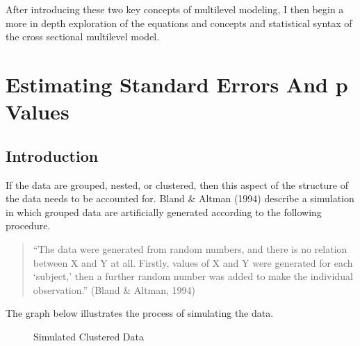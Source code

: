 \documentclass[
  letterpaper,
  DIV=11,
  numbers=noendperiod]{scrreprt}
\begin{document}
After introducing these two key concepts of multilevel modeling, I then
begin a more in depth exploration of the equations and concepts and
statistical syntax of the cross sectional multilevel model.

\section{Estimating Standard Errors And p Values}\label{sec-pvalues}

\subsection{Introduction}\label{introduction-1}

If the data are grouped, nested, or clustered, then this aspect of the
structure of the data needs to be accounted for. Bland \& Altman (1994)
describe a simulation in which grouped data are artificially generated
according to the following procedure. 

\begin{quote}
``The data were generated from random numbers, and there is no relation
between X and Y at all. Firstly, values of X and Y were generated for
each `subject,' then a further random number was added to make the
individual observation.'' (Bland \& Altman, 1994)
\end{quote}

The graph below illustrates the process of simulating the data.

\begin{figure}


\caption{\label{fig-simulatedclustereddata}Simulated Clustered Data}

\end{figure}%
\end{document}
